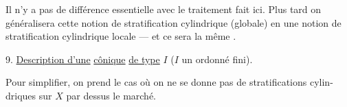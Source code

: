 Il n'y a pas de différence essentielle avec
le traitement fait ici. Plus tard on
généralisera cette notion de stratification
cylindrique (globale) en une notion de
stratification cylindrique locale --- et ce sera
la même .

9. \uline{Description d'une} 
 \uline{cônique} \uline{de type} \(I\)
(\(I\) un ordonné fini).

Pour simplifier, on prend  le cas où on
ne se donne pas de stratifications cylin-\\
driques sur \(X\) par dessus le marché.


